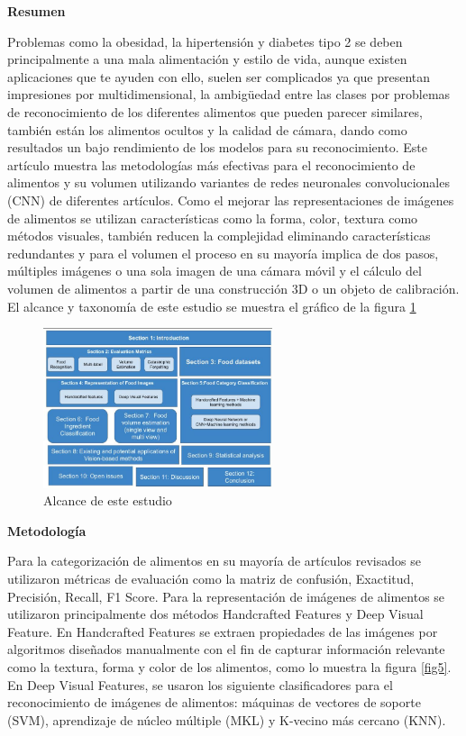 \textbf{Resumen}

\thinspace
Problemas como la obesidad, la hipertensión y diabetes tipo 2 se deben principalmente a una mala alimentación y estilo de vida, aunque existen aplicaciones que te ayuden con ello, suelen ser complicados ya que presentan impresiones por multidimensional, la ambigüedad entre las clases por problemas de reconocimiento de los diferentes alimentos que pueden parecer similares, también están los alimentos ocultos y la calidad de cámara, dando como resultados un bajo rendimiento de los modelos para su reconocimiento. Este artículo muestra las metodologías más efectivas para el reconocimiento de alimentos y su volumen utilizando variantes de redes neuronales convolucionales (CNN) de diferentes artículos. Como el mejorar las representaciones de imágenes de alimentos se utilizan características como la forma, color, textura como métodos visuales, también reducen la complejidad eliminando características redundantes y para el volumen el proceso en su mayoría implica de dos pasos, múltiples imágenes o una sola imagen de una cámara móvil y el cálculo del volumen de alimentos a partir de una construcción 3D o un objeto de calibración. El alcance y taxonomía de este estudio se muestra el gráfico de la figura \ref{fig4}

\begin{figure}[h]
		\begin{center}
			\includegraphics[width=0.6\textwidth]{2/imagen2/1FIGURA1PAPER1.JPG}
			\caption{Alcance de este estudio}
			\label{fig4}
		\end{center}
		
	\end{figure}

\thinspace
\textbf{Metodología}

\thinspace
Para la categorización de alimentos en su mayoría de artículos revisados se utilizaron métricas de evaluación como la matriz de confusión, Exactitud, Precisión, Recall, F1 Score. Para la representación de imágenes de alimentos se utilizaron principalmente dos métodos Handcrafted Features y Deep Visual Feature. En Handcrafted Features se extraen propiedades de las imágenes por algoritmos diseñados manualmente con el fin de capturar información relevante como la textura, forma y color de los alimentos, como lo muestra la figura \ref{fig5}. En Deep Visual Features, se usaron los siguiente clasificadores para el reconocimiento de imágenes de alimentos: máquinas de vectores de soporte (SVM), aprendizaje de núcleo múltiple (MKL) y K-vecino más cercano (KNN).

